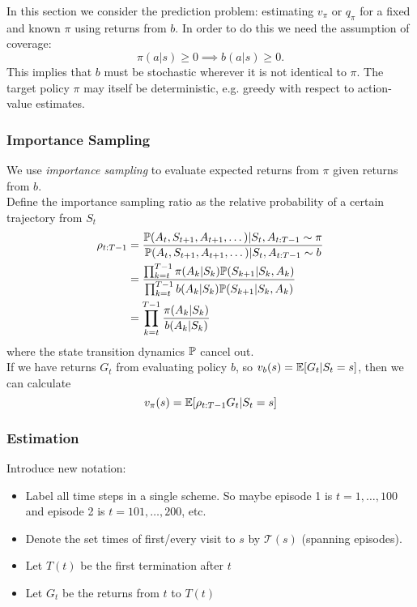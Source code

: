 In this section we consider the prediction problem: estimating $v_\pi$ or $q_\pi$ for a fixed and known $\pi$ using returns from $b$. In order to do this we need the assumption of coverage:
\begin{equation}
    \pi(a|s) \geq 0 \implies b(a|s) \geq 0.
\end{equation}
This implies that $b$ must be stochastic wherever it is not identical to $\pi$. The target policy $\pi$ may itself be deterministic, e.g. greedy with respect to action-value estimates.

\subsubsection*{Importance Sampling}
We use \emph{importance sampling} to evaluate expected returns from $\pi$ given returns from $b$.\\

Define the importance sampling ratio as the relative probability of a certain trajectory from $S_t$
\begin{align}
    \rho_{t:T-1} &= \frac{\P{}(A_t, S_{t+1}, A_{t+1}, \dots)| S_t, A_{t:T-1} \sim \pi}{\P{}(A_t, S_{t+1}, A_{t+1}, \dots)| S_t, A_{t:T-1} \sim b} \\
                 &= \frac{\prod_{k=t}^{T-1}\pi(A_k|S_k)\P{}(S_{k+1}|S_k, A_k)}{\prod_{k=t}^{T-1}b(A_k|S_k)\P{}(S_{k+1}|S_k, A_k)}\\
                 &=\prod_{k=t}^{T-1}\frac{\pi(A_k|S_k)}{b(A_k|S_k)}
\end{align}
where the state transition dynamics $\P{}$ cancel out.\\

If we have returns $G_t$ from evaluating policy $b$, so $v_b(s) = \E[G_t|S_t=s]$, then we can calculate
\[
    v_\pi(s) = \E[\rho_{t:T-1}G_t|S_t=s]
\]

\subsubsection*{Estimation}
Introduce new notation:
\begin{itemize}
    \item Label all time steps in a single scheme. So maybe episode 1 is $t=1, \dots, 100$ and episode 2 is $t = 101, \dots, 200$, etc.
    \item Denote the set times of first/every visit to $s$ by $\mathcal{T}(s)$ (spanning episodes).
    \item Let $T(t)$ be the first termination after $t$
    \item Let $G_t$ be the returns from $t$ to $T(t)$
\end{itemize}

